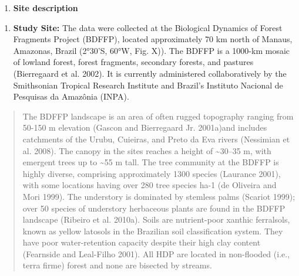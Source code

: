 \documentclass[
  english,
  man]{apa6}
\providecommand{\tightlist}{%
  \setlength{\itemsep}{0pt}\setlength{\parskip}{0pt}}
\begin{document}
\begin{enumerate}
\def\labelenumi{\arabic{enumi}.}
\tightlist
\item
  \textbf{Site description}
\end{enumerate}

\begin{enumerate}
\def\labelenumi{\alph{enumi}.}
\tightlist
\item
  \textbf{Study Site:} The data were collected at the Biological Dynamics
  of Forest Fragments Project (BDFFP), located approximately 70 km
  north of Manaus, Amazonas, Brazil (2°30'S, 60°W, Fig. X)). The BDFFP
  is a 1000-km mosaic of lowland forest, forest fragments, secondary
  forests, and pastures (Bierregaard et al. 2002). It is currently administered
  collaboratively by the Smithsonian Tropical Research Institute and
  Brazil's Instituto Nacional de Pesquisas da Amazônia (INPA).
\end{enumerate}

\begin{quote}
The BDFFP landscape is an area of often rugged topography ranging from
50-150 m elevation (Gascon and Bierregaard Jr. 2001a)and includes catchments of the Urubu,
Cuieiras, and Preto da Eva rivers (Nessimian et al. 2008). The canopy in the
sites reaches a height of \textasciitilde30--35 m, with emergent trees up to \textasciitilde55 m
tall. The tree community at the BDFFP is highly diverse, comprising
approximately 1300 species (Laurance 2001), with some locations having
over 280 tree species ha-1 (de Oliveira and Mori 1999). The understory is
dominated by stemless palms (Scariot 1999); over 50 species of
understory herbaceous plants are found in the BDFFP landscape
(Ribeiro et al. 2010a). Soils are nutrient-poor xanthic ferralsols, known as
yellow latosols in the Brazilian soil classification system. They have
poor water-retention capacity despite their high clay content
(Fearnside and Leal-Filho 2001). All HDP are located in non-flooded (i.e., terra
firme) forest and none are bisected by streams.
\end{quote}
\end{document}
